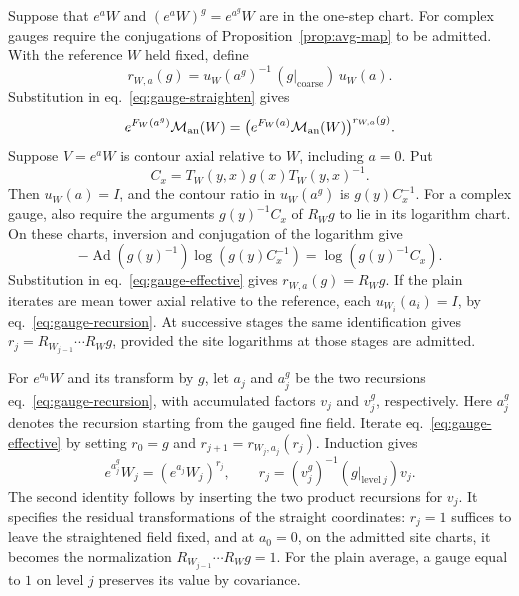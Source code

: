 \documentclass[11pt,letterpaper,reqno]{amsart}
\numberwithin{equation}{section}
\renewcommand{\eqref}[1]{\textup{eq.~\ref{#1}}}
\theoremstyle{definition}
\theoremstyle{remark}
\begin{document}
Suppose that \(e^aW\) and \((e^aW)^g=e^{a^g}W\) are in the
one-step chart. For complex gauges require the conjugations of
Proposition~\ref{prop:avg-map} to be admitted. With the reference
\(W\) held fixed, define
\begin{equation}\label{eq:gauge-effective}
 r_{W,a}(g)=u_W(a^g)^{-1}\,(g|_{\mathrm{coarse}})\,u_W(a).
\end{equation}
Substitution in \eqref{eq:gauge-straighten} gives
\[
 e^{F_W(a^g)}\mathcal M_{\rm an}(W)
    =\big(e^{F_W(a)}\mathcal M_{\rm an}(W)\big)^{r_{W,a}(g)} .
\]
Suppose \(V=e^aW\) is contour axial relative to \(W\), including
\(a=0\). Put
\[
 C_x=T_W(y,x)g(x)T_W(y,x)^{-1}.
\]
Then \(u_W(a)=I\), and the contour ratio in \(u_W(a^g)\) is
\(g(y)C_x^{-1}\). For a complex gauge, also require the arguments
\(g(y)^{-1}C_x\) of \(R_Wg\) to lie in its logarithm chart.
On these charts, inversion and conjugation of the logarithm give
\[
 -\operatorname{Ad}(g(y)^{-1})\log(g(y)C_x^{-1})
              =\log(g(y)^{-1}C_x).
\]
Substitution in \eqref{eq:gauge-effective} gives
\(r_{W,a}(g)=R_Wg\). If the plain iterates are mean tower axial
relative to the reference, each \(u_{W_i}(a_i)=I\), by
\eqref{eq:gauge-recursion}. At successive stages the same
identification gives \(r_j=R_{W_{j-1}}\cdots R_Wg\), provided
the site logarithms at those stages are admitted.

For \(e^{a_0}W\) and its transform by \(g\), let \(a_j\) and
\(a_j^g\) be the two recursions \eqref{eq:gauge-recursion}, with
accumulated factors \(v_j\) and \(v_j^g\), respectively. Here
\(a_j^g\) denotes the recursion starting from the gauged fine field.
Iterate \eqref{eq:gauge-effective} by setting \(r_0=g\) and
\(r_{j+1}=r_{W_j,a_j}(r_j)\). Induction gives
\begin{equation}\label{eq:gauge-effective-chain}
 e^{a_j^g}W_j=(e^{a_j}W_j)^{r_j},
 \qquad r_j=(v_j^g)^{-1}(g|_{\mathrm{level}\ j})v_j .
\end{equation}
The second identity follows by inserting the two product recursions
for \(v_j\). It specifies the residual transformations of the straight
coordinates: \(r_j=1\) suffices to leave the straightened field fixed,
and at \(a_0=0\), on the admitted site charts, it becomes the
normalization \(R_{W_{j-1}}\cdots R_Wg=1\).
For the plain average, a gauge equal to \(1\) on level \(j\) preserves
its value by covariance.
\end{document}
